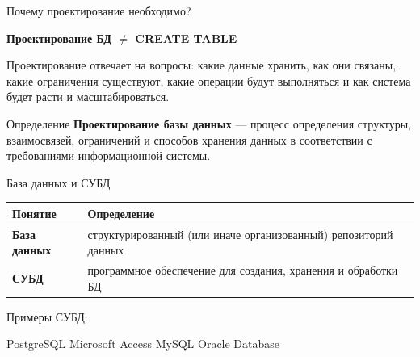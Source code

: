 \documentclass[aspectratio=169]{beamer}
\begin{document}
\begin{frame}{Почему проектирование необходимо?}

\begin{center}
\Large
\textbf{Проектирование БД $\neq$ CREATE TABLE}
\end{center}

\vspace{0.5cm}

Проектирование отвечает на вопросы: какие данные хранить,
как они связаны, какие ограничения существуют,
какие операции будут выполняться и как система
будет расти и масштабироваться.

\vspace{0.4cm}

\begin{block}{Определение}
\textbf{Проектирование базы данных} — процесс определения
структуры, взаимосвязей, ограничений и способов хранения
данных в соответствии с требованиями информационной системы.
\end{block}

\end{frame}


\begin{frame}{База данных и СУБД}

\begin{table}
\centering
\begin{tabular}{>{\bfseries}p{}|p{}}
\toprule
Понятие & Определение\\
\midrule
База данных &
структурированный (или иначе организованный) репозиторий данных\\
СУБД &
программное обеспечение для создания,
хранения и обработки БД\\
\bottomrule
\end{tabular}
\end{table}

\vspace{0.4cm}

Примеры СУБД:

\begin{center}
PostgreSQL \quad Microsoft Access \quad MySQL \quad Oracle Database
\end{center}

\end{frame}
\end{document}
